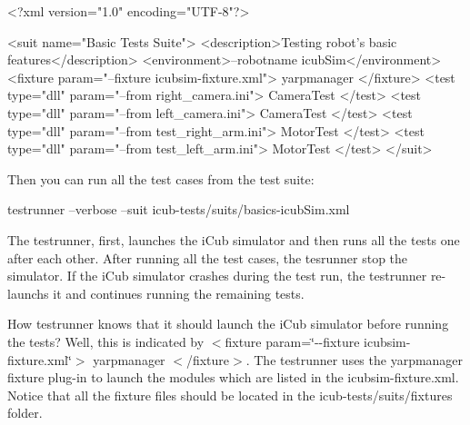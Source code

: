 \begin{DoxyCode}
<?xml version=\textcolor{stringliteral}{"1.0"} encoding=\textcolor{stringliteral}{"UTF-8"}?>

<suit name=\textcolor{stringliteral}{"Basic Tests Suite"}>
    <description>Testing robot\textcolor{stringliteral}{'s basic features</description>}
\textcolor{stringliteral}{    <environment>--robotname icubSim</environment>}
\textcolor{stringliteral}{    <fixture param="--fixture icubsim-fixture.xml"> yarpmanager </fixture>}
\textcolor{stringliteral}{}
\textcolor{stringliteral}{    }
\textcolor{stringliteral}{    <test type="dll" param="--from right\_camera.ini"> CameraTest </test>}
\textcolor{stringliteral}{    <test type="dll" param="--from left\_camera.ini"> CameraTest </test> }
\textcolor{stringliteral}{}
\textcolor{stringliteral}{    }
\textcolor{stringliteral}{    <test type="dll" param="--from test\_right\_arm.ini"> MotorTest </test>}
\textcolor{stringliteral}{    <test type="dll" param="--from test\_left\_arm.ini"> MotorTest </test>}
\textcolor{stringliteral}{</suit>}
\end{DoxyCode}


Then you can run all the test cases from the test suite\+:


\begin{DoxyCode}
testrunner --verbose --suit icub-tests/suits/basics-icubSim.xml
\end{DoxyCode}


The {\ttfamily testrunner}, first, launches the i\+Cub simulator and then runs all the tests one after each other. After running all the test cases, the {\ttfamily tesrunner} stop the simulator. If the i\+Cub simulator crashes during the test run, the {\ttfamily testrunner} re-\/launchs it and continues running the remaining tests.

How {\ttfamily testrunner} knows that it should launch the i\+Cub simulator before running the tests? Well, this is indicated by {\ttfamily $<$fixture param=\char`\"{}-\/-\/fixture icubsim-\/fixture.\+xml\char`\"{}$>$ yarpmanager $<$/fixture$>$}. The {\ttfamily testrunner} uses the {\ttfamily yarpmanager} fixture plug-\/in to launch the modules which are listed in the {\ttfamily icubsim-\/fixture.\+xml}. Notice that all the fixture files should be located in the {\ttfamily icub-\/tests/suits/fixtures} folder. 